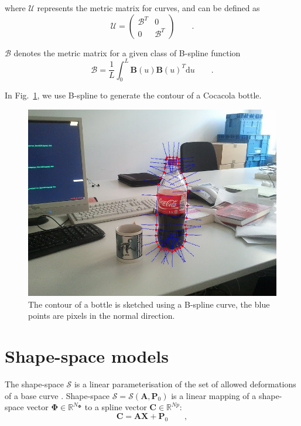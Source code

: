 where $\mathcal{U}$ represents the metric matrix for curves, and can be
defined as 
\begin{equation}
  \label{eq:4.14}
  \mathcal{U} =   \begin{pmatrix}
\mathcal{B}^T & 0 \\
0 &\mathcal{B}^T 
  \end{pmatrix} \qquad .
\end{equation}

$\mathcal{B}$ denotes the metric matrix for a given class of B-spline
function
\begin{equation}
  \label{eq:4.15}
  \mathcal{B}   = \frac{1}{L} \int_0^L \mathbf{B}(u)\mathbf{B}(u)^T \mathrm{d}u\qquad.
\end{equation}

In Fig.~\ref{fig:bsplinenormal}, we use B-spline to generate the contour of a
Cocacola bottle.
\begin{figure}[htb]
  \centering
  \includegraphics[width=12cm]{images/bsplinenormal.jpg}
  \caption[A contour and its normals]{The contour of a bottle is sketched using a B-spline
    curve, the blue points are pixels in the normal direction.}
\label{fig:bsplinenormal}
\end{figure}


\section{Shape-space models}
\label{sec:ssm}

The shape-space $\mathcal{S}$ is a linear parameterisation of the set of allowed
deformations of a base curve \cite{blake1998active}. Shape-space
$\mathcal{S} = \mathcal{S}(\mathbf{A},\mathbf{P}_0)$ is a linear mapping of a shape-space
vector $\mathbf{\Phi} \in  \mathbb{R}^{N_{\mathbf{\Phi}}}$ to a spline vector $\mathbf{C} \in
\mathbb{R}^{Np}$:
\begin{equation}
  \label{eq:4.16}
  \mathbf{C} = \mathbf{A}\mathbf{X}+ \mathbf{P}_0\qquad,
\end{equation}

